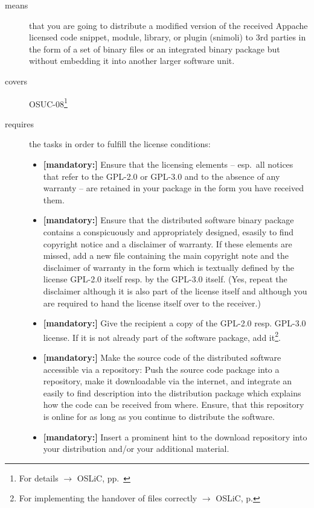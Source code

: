\begin{description}
\item[means] that you are going to distribute a modified version of the received
Appache licensed code snippet, module, library, or plugin (snimoli) to 3rd
parties in the form of a set of binary files or an integrated binary package but
without embedding it into another larger software unit.
\item[covers] OSUC-08\footnote{For details $\rightarrow$ OSLiC, pp.\ \pageref{OSUC-08-DEF}}
\item[requires] the tasks in order to fulfill the license conditions:
\begin{itemize}

  \item \textbf{[mandatory:]} Ensure that the licensing elements -- esp.\ all
  notices that refer to the GPL-2.0 or GPL-3.0 and to the absence of any
  warranty -- are retained in your package in the form you have received them.

  \item \textbf{[mandatory:]} Ensure that the distributed software binary
  package contains a conspicuously and appropriately designed, esasily to find
  copyright notice and a disclaimer of warranty. If these elements are missed,
  add a new file containing the main copyright note and the disclaimer of
  warranty in the form which is textually defined by the license GPL-2.0 itself
  resp. by the GPL-3.0 itself. (Yes, repeat the disclaimer although it is also
  part of the license itself and although you are required to hand the license
  itself over to the receiver.)
  
  \item \textbf{[mandatory:]} Give the recipient a copy of the GPL-2.0 resp.
  GPL-3.0 license. If it is not already part of the software package, add
  it\footnote{For implementing the handover of files correctly $\rightarrow$
  OSLiC, p. \pageref{DistributingFilesHint}}.

  \item \textbf{[mandatory:]} Make the source code of the distributed software
  accessible via a repository: Push the source code package into a repository,
  make it downloadable via the internet, and integrate an easily to find
  description into the distribution package which explains how the code can be
  received from where. Ensure, that this repository is online for as long as you
  continue to distribute the software.
  
  \item \textbf{[mandatory:]} Insert a prominent hint to the download repository
  into your distribution and/or your additional material.
  

\end{itemize}
\end{description}
